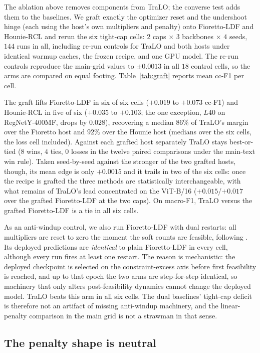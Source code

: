 \documentclass[10pt]{article}
\begin{document}
The ablation above removes components from TraLO; the converse test adds
them to the baselines. We graft exactly the optimizer reset and the
undershoot hinge (each using the host's own multipliers and penalty)
onto Fioretto-LDF and Hounie-RCL and rerun the six tight-cap cells:
$2$ caps $\times$ $3$ backbones $\times$ $4$ seeds, $144$ runs in all,
including re-run controls for TraLO and both hosts under identical
warmup caches, the frozen recipe, and one GPU model. The re-run
controls reproduce the main-grid values to $\pm0.0013$ in all $18$
control cells, so the arms are compared on equal footing.
Table~\ref{tab:graft} reports mean cc-F1 per cell.

The graft lifts Fioretto-LDF in six of six cells ($+0.019$ to $+0.073$
cc-F1) and Hounie-RCL in five of six ($+0.035$ to $+0.103$; the one
exception, $L40$ on RegNet{\color{blue}Y-400MF}, drops by $0.028$), recovering a median
$86\%$ of TraLO's margin over the Fioretto host and $92\%$ over the
Hounie host (medians over the six cells, the loss cell included).
Against each grafted host separately TraLO stays best-or-tied ($8$
wins, $4$ ties, $0$ losses in the twelve paired comparisons under the
main-text win rule). Taken seed-by-seed against the stronger of the two
grafted hosts, though, its mean edge is only $+0.0015$ and it trails in
two of the six cells: once the recipe is grafted the three methods are
statistically interchangeable, with what remains of TraLO's lead
concentrated on the ViT-B/16 ($+0.015$/$+0.017$ over the grafted
Fioretto-LDF at the two caps). On macro-F1, TraLO versus the grafted
Fioretto-LDF is a tie in all six cells.

As an anti-windup control, we also run Fioretto-LDF with dual restarts:
all multipliers are reset to zero the moment the soft counts are
feasible, following \citet{gallego2022controlled}. Its deployed
predictions are \emph{identical} to plain Fioretto-LDF in every cell,
although every run fires at least one restart. The reason is
mechanistic: the deployed checkpoint is selected on the
constraint-excess axis before first feasibility is reached, and up to
that epoch the two arms are step-for-step identical, so machinery that
only alters post-feasibility dynamics cannot change the deployed model.
TraLO beats this arm in all six cells. The dual baselines' tight-cap
deficit is therefore not an artifact of missing anti-windup machinery,
and the linear-penalty comparison in the main grid is not a strawman in
that sense.

\subsection{The penalty shape is neutral}
\label{app:shape}
\end{document}
